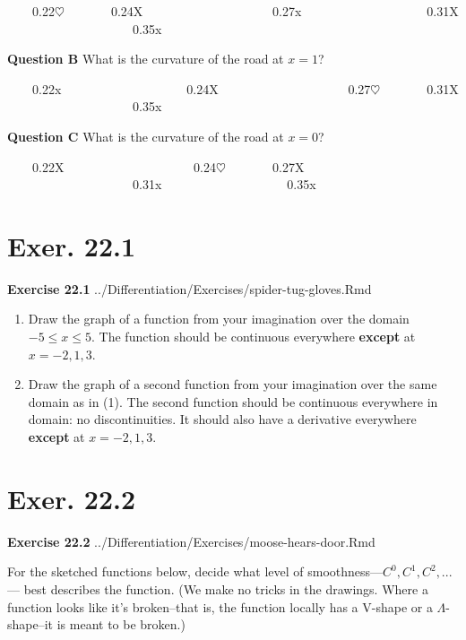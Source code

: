 \documentclass[
  letterpaper,
  DIV=11,
  numbers=noendperiod,
  oneside]{article}
\begin{document}
\begin{multicols}{2}
~~~~{0.22{\(\heartsuit\ \)}}~~~~~~~{0.24{︎X
~~~~~~~~~~~~~}}~~~~~~~{0.27{x~~~~~~~~~~~~~}}~~~~~~~{0.31{︎X
~~~~~~~~~~~~~}}~~~~~~~{0.35{x}}

\textbf{Question B} What is the curvature of the road at \(x=1\)?

~~~~{0.22{x~~~~~~~~~~~~~}}~~~~~~~{0.24{︎X
~~~~~~~~~~~~~}}~~~~~~~{0.27{\(\heartsuit\ \)}}~~~~~~~{0.31{︎X
~~~~~~~~~~~~~}}~~~~~~~{0.35{x}}

\textbf{Question C} What is the curvature of the road at \(x=0\)?

~~~~{0.22{︎X
~~~~~~~~~~~~~}}~~~~~~~{0.24{\(\heartsuit\ \)}}~~~~~~~{0.27{︎X
~~~~~~~~~~~~~}}~~~~~~~{0.31{x~~~~~~~~~~~~~}}~~~~~~~{0.35{x}}

\hypertarget{exer.-22.1}{%
\section*{Exer. 22.1}\label{exer.-22.1}}

\textbf{Exercise 22.1}
../Differentiation/Exercises/spider-tug-gloves.Rmd

\begin{enumerate}
\def\labelenumi{\arabic{enumi}.}
\item
  Draw the graph of a function from your imagination over the domain
  \(-5 \leq x \leq 5\). The function should be continuous everywhere
  \textbf{except} at \(x = -2, 1, 3\).
\item
  Draw the graph of a second function from your imagination over the
  same domain as in (1). The second function should be continuous
  everywhere in domain: no discontinuities. It should also have a
  derivative everywhere \textbf{except} at \(x = -2, 1, 3\).
\end{enumerate}

\hypertarget{exer.-22.2}{%
\section*{Exer. 22.2}\label{exer.-22.2}}

\textbf{Exercise 22.2} ../Differentiation/Exercises/moose-hears-door.Rmd

For the sketched functions below, decide what level of
smoothness---\(C^0, C^1, C^2, ...\)--- best describes the function. (We
make no tricks in the drawings. Where a function looks like it's
broken--that is, the function locally has a V-shape or a
\(\Lambda\)-shape--it is meant to be broken.)


\end{multicols}
\end{document}
